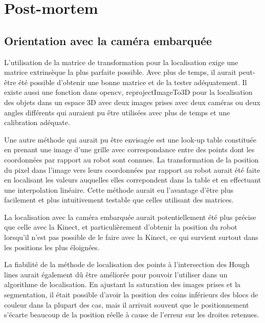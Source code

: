 

\chapter{Post-mortem}

\section{Orientation avec la caméra embarquée}

L'utilisation de la matrice de transformation pour la localisation exige une matrice extrinsèque la plus parfaite possible. Avec plus de temps, il aurait peut-être été possible d'obtenir une bonne matrice et de la tester adéquatement. Il existe aussi une fonction dans opencv, reprojectImageTo3D pour la localisation des objets dans un espace 3D avec deux images prises avec deux caméras ou deux angles différents qui auraient pu être utilisées avec plus de temps et une calibration adéquate. 

Une autre méthode qui aurait pu être envisagée est une look-up table constituée en prenant une image d'une grille avec correspondance entre des points dont les coordonnées par rapport au robot sont connues. La transformation de la position du pixel dans l'image vers leurs coordonnées par rapport au robot aurait été faite en localisant les valeurs auquelles elles correpondent dans la table et en effectuant une interpolation linéaire. Cette méthode aurait eu l'avantage d'être plus facilement et plus intuitivement testable que celles utilisant des matrices.

La localisation avec la caméra embarquée aurait potentiellement été plus précise que celle avec la Kinect, et particulièrement d'obtenir la position du robot lorsqu'il n'est pas possible de le faire avec la Kinect, ce qui survient surtout dans les positions les plus éloignées. 

La fiabilité de la méthode de localisation des points à l'intersection des Hough lines aurait également dû être améliorée pour pouvoir l'utiliser dans un algorithme de localisation. En ajustant la saturation des images prises et la segmentation, il était possible d'avoir la position des coins inférieurs des blocs de couleur dans la plupart des cas, mais il arrivait souvent que le positionnement s'écarte beaucoup de la position réelle à cause de l'erreur sur les droites retenues.
